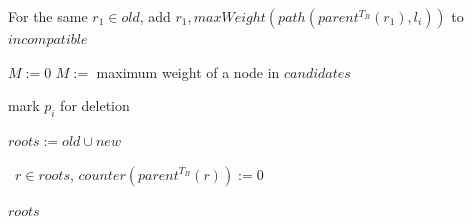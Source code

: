 \documentclass{article}
\newcommand{\leafset}{\Lambda}
\begin{document}
\begin{algorithm}
\begin{algorithmic}[1]
                    \State For the same $r_1 \in old$, add $r_1, maxWeight(path(parent^{T_B}(r_1), l_i))$ to $incompatible$
                \EndIf

                    {$M := 0$}
                    $M :=$ maximum weight of a node in $candidates$

                \IIf{$w(\leafset(T_A[p_i])) \leq M$}
                    mark $p_i$ for deletion

                \State $roots := old \cup new$
            \EndFor

            \State \algorithmicforall\ $r \in roots$, $counter(parent^{T_B}(r)) := 0$

            \State \Return $roots$
        \end{algorithmic}
    \end{algorithm}
\end{document}
